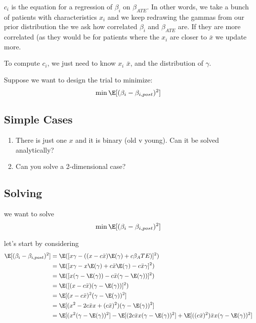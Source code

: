 \begin{enumerate}
\begin{enumerate}
				$c_i$ is the equation for a regression of $\beta_i$ on $\beta_{ATE}$. In other words, we take a bunch of patients with characteristics $x_i$ and we keep redrawing the gammas from our prior distribution the we ask how correlated  $\beta_i$ and $\beta_{ATE}$ are. If they are more correlated (as they would be for patients where the $x_i$ are closer to $\bar{x}$ we update more.

				To compute $c_i$, we just need to know $x_i$ $\bar{x}$, and the distribution of $\gamma$.

				Suppose we want to design the trial to minimize:
				\begin{align*}
					\min \E[(\beta_i - \beta_{i,post})^2]
				\end{align*} 
		\end{enumerate}

\end{enumerate} 

\subsection*{Simple Cases}
\begin{enumerate}
	\item There is just one $x$ and it is binary (old v young). Can it be solved analytically?
	\item Can you solve a 2-dimensional case? 
\end{enumerate}


\subsection*{Solving}

we want to solve
\begin{align*}
	\min \E[(\beta_i - \beta_{i,post})^2]
\end{align*} 

let's start by considering
\begin{align*}
	\E[(\beta_i - \beta_{i,post})^2] &= \E([ x \gamma  - ((x - c\bar{x}) \E(\gamma) + c \beta_ATE)]^2) \\
									 &= \E( [x \gamma - x \E(\gamma) + c \bar{x} \E(\gamma) - c \bar{x} \gamma ]^2 ) \\
									 &= \E ( [x ( \gamma - \E(\gamma)) - c\bar{x} ( \gamma - \E(\gamma))]^2) \\
									 &= \E([ ( x - c \bar{x}) (\gamma - \E(\gamma))]^2) \\
									 &= \E[ ( x - c \bar{x})^2 (\gamma - \E(\gamma))^2] \\
									 &= \E[ ( x^2 - 2 c \bar{x}x + (c \bar{x})^2) (\gamma - \E(\gamma))^2] \\
									 &= \E[ ( x^2 (\gamma - \E(\gamma))^2]  - \E[ ( 2 c \bar{x}x (\gamma - \E(\gamma))^2] + \E[ ( (c \bar{x})^2) \bar{x}x (\gamma - \E(\gamma))^2] \\
\end{align*} 

